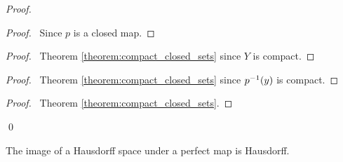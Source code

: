 \begin{proof}
    \pf
    \begin{proof}
        \pf\ Since $p$ is a closed map.
    \end{proof}
    \begin{proof}
        \pf\ Theorem \ref{theorem:compact_closed_sets} since $Y$ is compact.
    \end{proof}
    \begin{proof}
        \pf\ Theorem \ref{theorem:compact_closed_sets} since ${p}^{-1}(y)$ is compact.
    \end{proof}
    \qedstep
    \begin{proof}
        \pf\ Theorem \ref{theorem:compact_closed_sets}.
    \end{proof}
    \qed
\end{proof}

\begin{proposition}
    \label{proposition:perfect_image_Hausdorff}
    The image of a Hausdorff space under a perfect map is Hausdorff.
\end{proposition}


